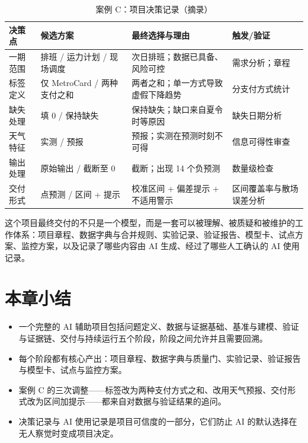 \begin{table}[H]
\centering
\caption{案例 C：项目决策记录（摘录）}
\label{tab:ch15_decisions}
\small
\begin{tabular}{p{2.2cm}p{3.6cm}p{4.2cm}p{2.8cm}}
\toprule
决策点 & 候选方案 & 最终选择与理由 & 触发/验证 \\
\midrule
一期范围 & 排班 / 运力计划 / 现场调度 & 次日排班；数据已具备、风险可控 & 需求分析；章程 \\
标签定义 & 仅 MetroCard / 两种支付之和 & 两者之和；单一方式导致虚假下降趋势 & 分支付方式统计 \\
缺失处理 & 填 0 / 保持缺失 & 保持缺失；缺口来自夏令时等原因 & 缺失日期分析 \\
天气特征 & 实测 / 预报 & 预报；实测在预测时刻不可得 & 信息可得性审查 \\
输出处理 & 原始输出 / 截断至 0 & 截断；出现 14 个负预测 & 数量级检查 \\
交付形式 & 点预测 / 区间 + 提示 & 校准区间 + 偏差提示 + 不适用警示 & 区间覆盖率与散场误差分析 \\
\bottomrule
\end{tabular}
\end{table}

这个项目最终交付的不只是一个模型，而是一套可以被理解、被质疑和被维护的工作体系：项目章程、数据字典与合并规则、实验记录、验证报告、模型卡、试点方案、监控方案，以及记录了哪些内容由 AI 生成、经过了哪些人工确认的 AI 使用记录。

\section{本章小结}

\begin{itemize}
  \item 一个完整的 AI 辅助项目包括问题定义、数据与证据基础、基准与建模、验证与证据链、交付与持续运行五个阶段，阶段之间允许并且需要回溯。
  \item 每个阶段都有核心产出：项目章程、数据字典与质量门、实验记录、验证报告与模型卡、试点与监控方案。
  \item 案例 C 的三次调整——标签改为两种支付方式之和、改用天气预报、交付形式改为区间加提示——都来自对数据与验证结果的追问。
  \item 决策记录与 AI 使用记录是项目可信度的一部分，它们防止 AI 的默认选择在无人察觉时变成项目决定。
\end{itemize}



